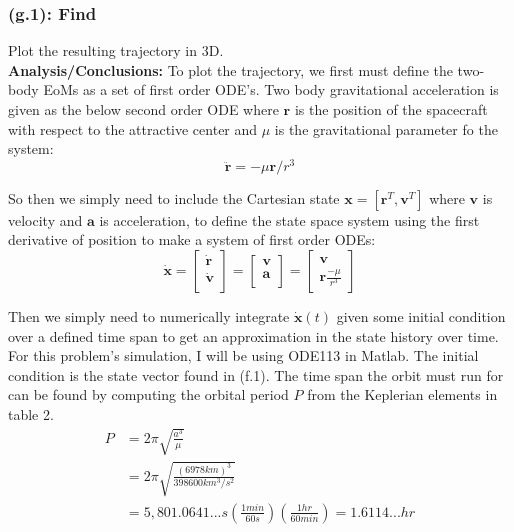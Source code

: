 \documentclass[titlepage]{article}
\begin{document}
\subsubsection*{(g.1): Find}
Plot the resulting trajectory in 3D.\\

\textbf{Analysis/Conclusions:}
To plot the trajectory, we first must define the two-body EoMs as a set of first order ODE's. Two body gravitational acceleration is given as the below second order ODE where $\boldsymbol{r}$ is the position of the spacecraft with respect to the attractive center and $\mu$ is the gravitational parameter fo the system:
\begin{equation}
	\ddot{\boldsymbol{r}}=-\mu\boldsymbol{r}/r^3
\end{equation}

So then we simply need to include the Cartesian state $\boldsymbol{x}=[\boldsymbol{r}^T, \boldsymbol{v}^T]$ where $\boldsymbol{v}$ is velocity and $\boldsymbol{a}$ is acceleration, to define the state space system using the first derivative of position to make a system of first order ODEs:
\begin{equation}
	\dot{\boldsymbol{x}}=
	\begin{bmatrix}
		\dot{\boldsymbol{r}} \\
		\dot{\boldsymbol{v}} \\
	\end{bmatrix}=
	\begin{bmatrix}
		\boldsymbol{v} \\
		\boldsymbol{a} \\
	\end{bmatrix}=
	\begin{bmatrix}
		\boldsymbol{v} \\
		\boldsymbol{r}\frac{-\mu}{r^3}
	\end{bmatrix}
\end{equation} 

Then we simply need to numerically integrate $\dot{\boldsymbol{x}}(t)$ given some initial condition over a defined time span to get an approximation in the state history over time. For this problem's simulation, I will be using ODE113 in Matlab. The initial condition is the state vector found in (f.1). The time span the orbit must run for can be found by computing the orbital period $P$ from the Keplerian elements in table 2.
\begin{equation}
	\begin{split}
		P&=2\pi\sqrt{\frac{a^3}{\mu}}\\
		&=2\pi\sqrt{\frac{(6978km)^3}{398600km^3/s^2}}\\
		&=5,801.0641...s\left(\frac{1min}{60s}\right)\left(\frac{1hr}{60min}\right)=1.6114...hr
	\end{split}
\end{equation}
\end{document}
